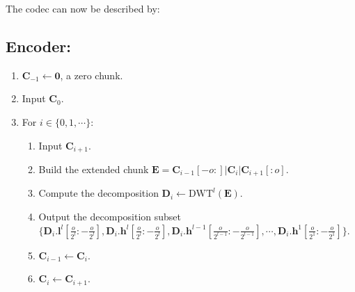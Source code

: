 
The codec can now be described by:

\subsection*{Encoder:}
\begin{enumerate}
\item ${\mathbf C}_{-1}\leftarrow{\mathbf 0}$, a zero chunk.
\item Input ${\mathbf C}_0$.
\item For $i\in\{0,1,\cdots\}$:   
  \begin{enumerate}               
  \item Input ${\mathbf C}_{i+1}$.
  \item Build the extended chunk ${\mathbf E} = {\mathbf
    C}_{i-1}[-o:]|{\mathbf C}_i|{\mathbf C}_{i+1}[:o]$.
  \item Compute the decomposition ${\mathbf D}_i \leftarrow
    \text{DWT}^l({\mathbf E})$.
  \item Output the decomposition subset
    $\Big\{{\mathbf D}_i.{\mathbf l}^l[\frac{o}{2^l}:-\frac{o}{2^l}], {\mathbf
      D}_i.{\mathbf h}^l[\frac{o}{2^l}:-\frac{o}{2^l}], {\mathbf D}_i.{\mathbf
      h}^{l-1}[\frac{o}{2^{l-1}}:-\frac{o}{2^{l-1}}], \cdots, {\mathbf D}_i.{\mathbf
      h}^1[\frac{o}{2^1}:-\frac{o}{2^1}]\Big\}$.
  \item ${\mathbf C}_{i-1}\leftarrow {\mathbf C}_i$.
  \item ${\mathbf C}_i\leftarrow {\mathbf C}_{i+1}$.
  \end{enumerate}
\end{enumerate}

